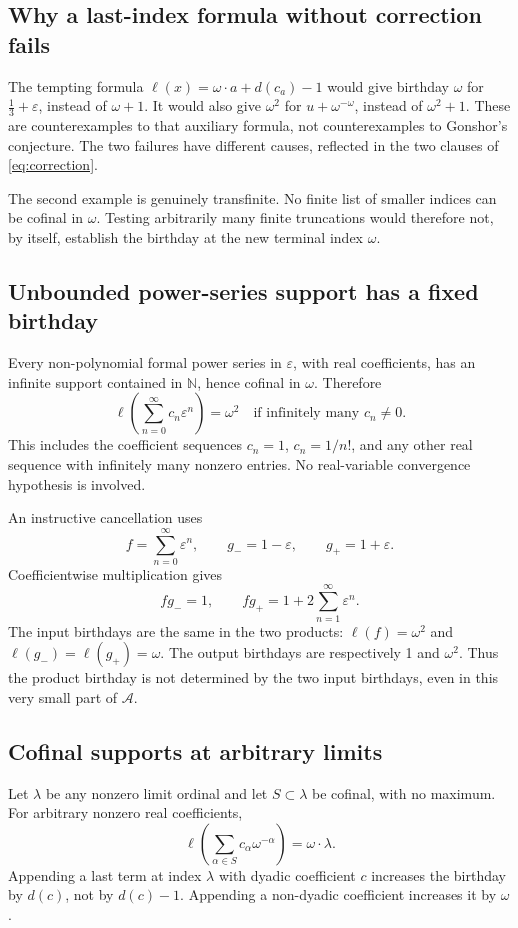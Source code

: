 \documentclass[11pt,letterpaper]{article}
\theoremstyle{definition}
\theoremstyle{remark}
\newcommand{\N}{\mathbb{N}}
\newcommand{\A}{\mathscr{A}}
\newcommand{\bd}{\ell}
\newcommand{\ep}{\varepsilon}
\begin{document}
\subsection{Why a last-index formula without correction fails}
The tempting formula
\(\bd(x)=\omega\cdot a+d(c_a)-1\) would give birthday \(\omega\)
for \(\frac13+\ep\), instead of \(\omega+1\). It would also give
\(\omega^2\) for \(u+\omega^{-\omega}\), instead of \(\omega^2+1\).
These are counterexamples to that auxiliary formula, not counterexamples
to Gonshor's conjecture. The two failures have different causes, reflected
in the two clauses of \eqref{eq:correction}.

The second example is genuinely transfinite. No finite list of smaller
indices can be cofinal in \(\omega\). Testing arbitrarily many finite
truncations would therefore not, by itself, establish the birthday at the
new terminal index \(\omega\).

\subsection{Unbounded power-series support has a fixed birthday}
Every non-polynomial formal power series in \(\ep\), with real
coefficients, has an infinite support contained in \(\N\), hence
cofinal in \(\omega\). Therefore
\begin{equation}\label{eq:power-series}
 \bd\left(\sum_{n=0}^{\infty}c_n\ep^n\right)=\omega^2
 \quad\text{if infinitely many }c_n\ne0.
\end{equation}
This includes the coefficient sequences \(c_n=1\), \(c_n=1/n!\),
and any other real sequence with infinitely many nonzero entries.
No real-variable convergence hypothesis is involved.

An instructive cancellation uses
\[
 f=\sum_{n=0}^{\infty}\ep^n,\qquad
 g_-=1-\ep,\qquad g_+=1+\ep.
\]
Coefficientwise multiplication gives
\[
 fg_-=1,\qquad fg_+=1+2\sum_{n=1}^{\infty}\ep^n.
\]
The input birthdays are the same in the two products:
\(\bd(f)=\omega^2\) and \(\bd(g_-)=\bd(g_+)=\omega\).
The output birthdays are respectively 1 and \(\omega^2\).
Thus the product birthday is not determined by the two input birthdays,
even in this very small part of \(\A\).

\subsection{Cofinal supports at arbitrary limits}
Let \(\lambda\) be any nonzero limit ordinal and let \(S\subset\lambda\)
be cofinal, with no maximum. For arbitrary nonzero real coefficients,
\[
 \bd\left(\sum_{\alpha\in S}c_\alpha\omega^{-\alpha}\right)
    =\omega\cdot\lambda.
\]
Appending a last term at index \(\lambda\) with dyadic coefficient
\(c\) increases the birthday by \(d(c)\), not by \(d(c)-1\).
Appending a non-dyadic coefficient increases it by \(\omega\).
\end{document}
